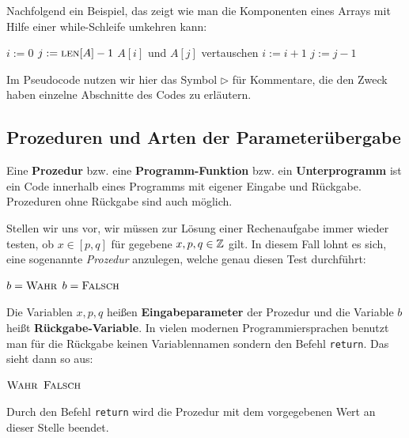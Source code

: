 \begin{bsp} 
Nachfolgend ein Beispiel, das zeigt wie man die Komponenten eines Arrays mit Hilfe einer while-Schleife umkehren kann:
\begin{center}
	\begin{algorithmic}[1]
		\STATE $i:=0$
		\STATE $j:=\mathop{\text{\textsc{len}}}[A]-1$
		\STATE $A[i]$ und $A[j]$ vertauschen 
		\STATE $i:=i+1$ 
		\STATE $j:=j-1$ 
		\ENDWHILE
	\end{algorithmic}
\end{center}
\end{bsp} 

\begin{bem} 
Im Pseudocode nutzen wir hier das Symbol $\triangleright$ für Kommentare, die den Zweck haben einzelne Abschnitte des Codes zu erläutern.
\end{bem} 


\subsection{Prozeduren und Arten der Parameterübergabe}
\label{sect:prozeduren}

\begin{defn}
Eine \textbf{Prozedur} bzw. eine \textbf{Programm-Funktion} bzw. ein \textbf{Unterprogramm} ist ein Code innerhalb eines Programms mit eigener Eingabe und Rückgabe. Prozeduren ohne Rückgabe sind auch möglich. 
\end{defn} 

\begin{bem} 
Stellen wir uns vor, wir müssen zur Lösung einer Rechenaufgabe immer wieder testen, ob $ x \in [p,q]$ für gegebene $x,p,q \in \mathbb{Z}$ gilt. In diesem Fall lohnt es sich, eine sogenannte \emph{Prozedur} anzulegen, welche genau diesen Test durchführt:

\begin{algorithm}[H]
	\caption{$b=\cc{Ist-zwischen}(x,p,q)$}
	\begin{algorithmic}
		\STATE $b=\mathop{\text{\textsc{Wahr}}}$
		\ENDIF
		\STATE $b=\mathop{\text{\textsc{Falsch}}}$
	\end{algorithmic}
\end{algorithm}

Die Variablen $x,p,q$ heißen \textbf{Eingabeparameter} der Prozedur und die Variable $b$ heißt \textbf{Rückgabe-Variable}. In vielen modernen Programmiersprachen benutzt man für die Rückgabe keinen Variablennamen sondern den Befehl \texttt{return}. Das sieht dann so aus: 

\begin{algorithm}[H]
	\caption{$\cc{Ist-zwischen}(x,p,q)$}
	\begin{algorithmic}
		\IF{$p \le x \le q$ oder $q \le x \le p$}
		\RETURN $\mathop{\text{\textsc{Wahr}}}$
		\ENDIF
		\RETURN $\mathop{\text{\textsc{Falsch}}}$
	\end{algorithmic}
\end{algorithm}
Durch den Befehl \texttt{return} wird die Prozedur mit dem vorgegebenen Wert an dieser Stelle beendet.
\end{bem} 


